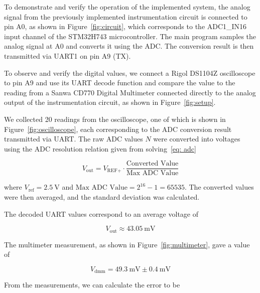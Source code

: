 \documentclass[12pt,a4paper]{article}
\begin{document}
To demonstrate and verify the operation of the implemented system, the analog signal from the previously implemented instrumentation circuit is connected to pin A0, as shown in Figure~\ref{fig:circuit}, which corresponds to the ADC1\_IN16 input channel of the STM32H743 microcontroller. The main program samples the analog signal at A0 and converts it using the ADC. The conversion result is then transmitted via UART1 on pin A9 (TX). 

To observe and verify the digital values, we connect a Rigol DS1104Z oscilloscope to pin A9 and use its UART decode function and compare the value to the reading from a Sanwa CD770 Digital Multimeter connected directly to the analog output of the instrumentation circuit, as shown in Figure~\ref{fig:setup}.

We collected 20 readings from the oscilloscope, one of which is shown in Figure~\ref{fig:oscilloscope}, each corresponding to the ADC conversion result transmitted via UART. The raw ADC values $N$ were converted into voltages using the ADC resolution relation given from solving~\eqref{eq: adc}

\begin{equation*}
    V_{\text{out}} = V_{\text{REF+}} \cdot \frac{\text{Converted Value}}{\text{Max ADC Value}}
\end{equation*}

where $V_{\text{ref}} = \SI{2.5}{\volt}$ and $\text{Max ADC Value} = 2^{16}-1 = 65535$. The converted values were then averaged, and the standard deviation was calculated.

The decoded UART values correspond to an average voltage of

\[
    V_{\text{out}} \approx \SI{43.05}{\milli\volt}
\]

The multimeter measurement, as shown in Figure~\ref{fig:multimeter}, gave a value of

\[
    V_{\text{dmm}} = \SI{49.3}{\milli\volt} \pm \SI{0.4}{\milli\volt}
\]  

From the measurements, we can calculate the error to be

\end{document}
